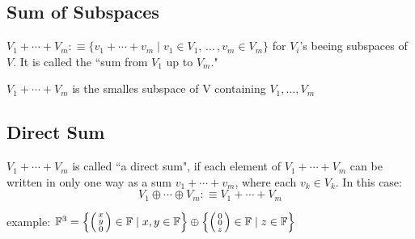 
\subsection{Sum of Subspaces}

\setcounter{thm}{35}

\begin{mydef}
    $V_1 + \cdots + V_m :\equiv \{v_1 + \cdots + v_m \mid v_1 \in V_1, \, \dots \, , v_m \in V_m \}$ for $V_i$'s beeing subspaces of $V$. It is called the ``sum from $V_1$ up to $V_m$."
\end{mydef} 

\setcounter{thm}{39}
\begin{thm}
    $V_1 + \cdots + V_m$ is the smalles subspace of V containing $V_1, \dots, V_m$
\end{thm}

\subsection{Direct Sum}

\setcounter{thm}{40}
\begin{thm}
    $V_1 + \cdots + V_m$ is called ``a direct sum", if each element of $V_1 +\cdots+V_m$ can be written in only one way as a sum $v_1 + \cdots + v_m$, where each $v_k \in V_k$. In this case: 
    \begin{equation}
    	V_1 \oplus \cdots \oplus V_m :\equiv V_1 + \cdots + V_m
    \end{equation}
\end{thm}

\begin{example}
   example: $\mathbb{F}^3 = 
   \left \{ \left ( \begin{smallmatrix} x \\ y \\ 0 \end{smallmatrix} \right ) \in \mathbb{F} \mid x,y \in \mathbb{F} \right \} 
   \oplus 
   \left \{ \left ( \begin{smallmatrix} 0 \\ 0 \\ z \end{smallmatrix} \right ) \in \mathbb{F} \mid z \in \mathbb{F} \right \}$ 
\end{example}


